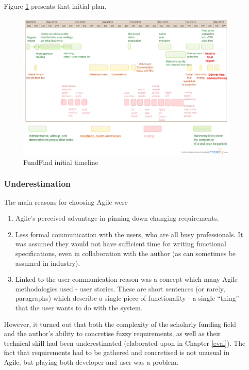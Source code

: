 Figure \ref{fig:timeline} presents that initial plan.
\newpage
\begin{figure}[H]
\centering
\includegraphics[height=0.6\textheight,angle=90]{Images/timeline.png}
\caption{FundFind initial timeline}
\label{fig:timeline}
\end{figure}
\newpage

\subsubsection{Underestimation}

The main reasons for choosing Agile were
\label{agile-reasons}
\begin{enumerate}
 \item Agile's perceived advantage in pinning down changing requirements.
 \item Less formal communication with the users, who are all busy professionals. It was assumed they would not have sufficient time for writing functional specifications, even in collaboration with the author (as can sometimes be assumed in industry).
 \item Linked to the user communication reason was a concept which many Agile methodologies used - user stories. These are short sentences (or rarely, paragraphs) which describe a single piece of functionality - a single ``thing'' that the user wants to do with the system.
\end{enumerate}

However, it turned out that both the complexity of the scholarly funding field and the author's ability to concretise fuzzy requirements, as well as their technical skill had been underestimated (elaborated upon in Chapter \ref{eval}). The fact that requirements had to be gathered and concretised is not unusual in Agile, but playing both developer and user was a problem. 

